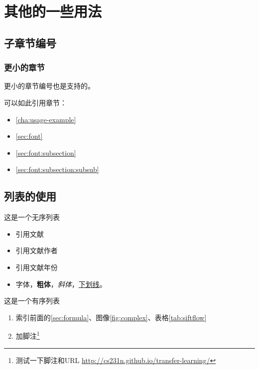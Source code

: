 \section{其他的一些用法}
\label{sec:font}
\subsection{子章节编号}
\label{sec:font:subsection}
\subsubsection{更小的章节}
\label{sec:font:subsection:subsub}
更小的章节编号也是支持的。

可以如此引用章节：

\begin{itemize}
    \item \autoref{cha:usage-example}
    \item  \autoref{sec:font}
    \item  \autoref{sec:font:subsection}
    \item  \autoref{sec:font:subsection:subsub}
\end{itemize}


\subsection{列表的使用}
\label{sec:font:list}

这是一个无序列表
\begin{itemize}
    \item 引用文献\cite{long2015fully}
    \item 引用文献作者\citeauthor{long2015fully}
    \item 引用文献年份\citeyear{long2015fully} 
    \item 字体{\color{red}{变红}}，\textbf{粗体}，\textit{斜体}，\underline{下划线}。
\end{itemize}

这是一个有序列表
\begin{enumerate}
    \item 索引前面的\autoref{sec:formula}、图像\ref{fig:complex}、表格\ref{tab:siftflow}
    \item 加脚注\footnote{测{试一下}脚注和URL \url{http://cs231n.github.io/transfer-learning/}}
\end{enumerate}


